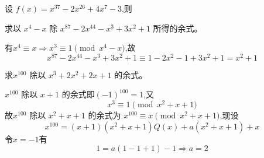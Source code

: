\begin{questions}
    
    \question 设 $f(x) = x^{37} - 2 x^{26} + 4 x^7 - 3$,则

    \question 求以 $x^4 - x$ 除 $x^{87} - 2 x^{44} - x^3 + 3 x^2 + 1$ 所得的余式。
    \begin{solution}
        有$x^4\equiv x \Rightarrow x^3\equiv 1\pmod{x^4-x}$,故
        \[
        x^{87} - 2 x^{44} - x^3 + 3 x^2 + 1
        \equiv 1 - 2 x^2 - 1 + 3 x^2 + 1
        = x^2 + 1      
        \]
    \end{solution}
                
    \question 求$x^{100}$ 除以 $x^3 + 2 x^2 + 2 x + 1$ 的余式。
    \begin{solution}
        $x^{100}$ 除以 $x+1$ 的余式即$(-1)^{100}=1$,又\[
        x^3\equiv1\pmod{x^2+x+1}
        \]故$x^{100}$ 除以 $x^2+x+1$ 的余式为 $x^{100} \equiv x\pmod{x^2+x+1}$,现设$$x^{100}=(x+1)(x^2+x+1)Q(x)+a(x^2+x+1)+x$$
        令$x=-1$有$$1=a(1-1+1)-1\Rightarrow a=2$$


\end{solution}
\end{questions}
